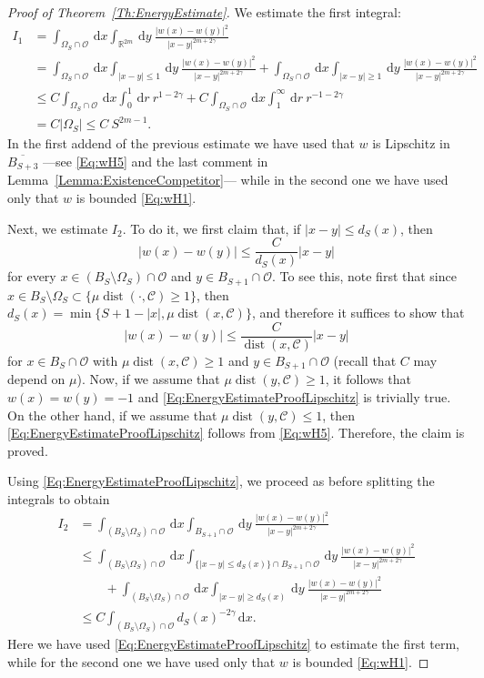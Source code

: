 \documentclass[12pt,reqno]{amsart}
\theoremstyle{definition}
\theoremstyle{remark}
\newcommand{\con}[1]{\mathbb{#1}}
\newcommand{\R}{\con{R}} %
\newcommand{\ccal}{\mathscr{C}}
\newcommand{\ocal}{\mathcal{O}}
\newcommand{\s}{\gamma}
\renewcommand{\d}{\,\mathrm{d}} %
\DeclareMathOperator{\dist}{dist}
\numberwithin{equation}{section}
\begin{document}
\begin{proof}[Proof of Theorem~\ref{Th:EnergyEstimate}]
	We estimate the first integral:
	\begin{align*}
	I_1 &= \int_{\Omega_{S}\cap \ocal} \d x \int_{\R^{2m}} \d y \  \frac{|w(x)-w(y)|^2}{|x-y|^{2m+2\s}} \\
	&= \int_{\Omega_{S}\cap \ocal} \d x \int_{|x-y|\leq 1} \d y \ \frac{|w(x)-w(y)|^2}{|x-y|^{2m+2\s}} + \int_{\Omega_{S}\cap \ocal} \d x \int_{|x-y|\geq 1} \d y \ \frac{|w(x)-w(y)|^2}{|x-y|^{2m+2\s}} \\
	&\leq C \int_{\Omega_{S}\cap \ocal} \d x \int_0^1 \d r \ r^{1-2\s} + C \int_{\Omega_{S}\cap \ocal} \d x \int_1^\infty \d r \ r^{-1-2\s} \\
	&= C |\Omega_S| \leq C \ S^{2m-1}.
	\end{align*}
	In the first addend of the previous estimate we have used that $w$ is Lipschitz in $\overline{B_{S+3}}$ ---see \eqref{Eq:wH5} and the last comment in Lemma~\ref{Lemma:ExistenceCompetitor}--- while in the second one we have  used only that $w$ is bounded \eqref{Eq:wH1}. 
	
	Next, we estimate $I_2$. To do it, we first claim that, if $|x-y|\leq d_S(x)$, then
	\begin{equation}
	\label{Eq:EnergyEstimateProofLipschitz}
	|w(x)-w(y)| \leq \dfrac{C}{d_S(x)} |x-y|	
	\end{equation}
	for every $x\in (B_S\setminus \Omega_S)\cap \ocal$ and $y \in B_{S+1}\cap \ocal$. To see this, note first that since $x\in B_S\setminus \Omega_S \subset \{\mu \dist (\cdot, \ccal) \geq 1\}$, then $d_S(x)=\min \{S+1-|x| , \mu \dist (x, \ccal)\}$, and therefore it suffices to show that
	$$
	|w(x)-w(y)| \leq \dfrac{C}{\dist (x, \ccal)} |x-y|
	$$
	for $x\in B_S \cap \ocal$ with $\mu \dist (x, \ccal) \geq 1$ and $y \in B_{S+1}\cap \ocal$ (recall that $C$ may depend on $\mu$). Now, if we assume that $\mu \dist (y, \ccal) \geq 1$, it follows that $w(x)=w(y)=-1$ and \eqref{Eq:EnergyEstimateProofLipschitz} is trivially true. On the other hand, if we assume that $\mu \dist (y, \ccal) \leq 1$, then \eqref{Eq:EnergyEstimateProofLipschitz} follows from \eqref{Eq:wH5}. Therefore, the claim is proved.
	
	Using \eqref{Eq:EnergyEstimateProofLipschitz}, we proceed as before splitting the integrals to obtain
	\begin{align*}
	I_2 &= \int_{(B_S\setminus \Omega_S)\cap \ocal} \d x \int_{B_{S+1}\cap \ocal} \d y \  \frac{|w(x)-w(y)|^2}{|x-y|^{2m+2\s}}   \\
	&\leq \int_{(B_S\setminus \Omega_S)\cap \ocal} \d x \int_{ \{|x-y|\leq d_S(x)\} \cap B_{S+1}\cap \ocal} \d y \  \frac{|w(x)-w(y)|^2}{|x-y|^{2m+2\s}} \\
	& \quad \quad + \int_{(B_S\setminus \Omega_S)\cap \ocal} \d x \int_{|x-y|\geq d_S(x)} \d y \ \frac{|w(x)-w(y)|^2}{|x-y|^{2m+2\s}} \\
	&\leq C \int_{(B_S\setminus \Omega_S)\cap \ocal} d_S(x)^{-2\s} \d x .
	\end{align*}
	Here we have used \eqref{Eq:EnergyEstimateProofLipschitz} to estimate the first term, while for the second one we have used only that $w$ is bounded \eqref{Eq:wH1}. 
	

\end{proof}
\end{document}
